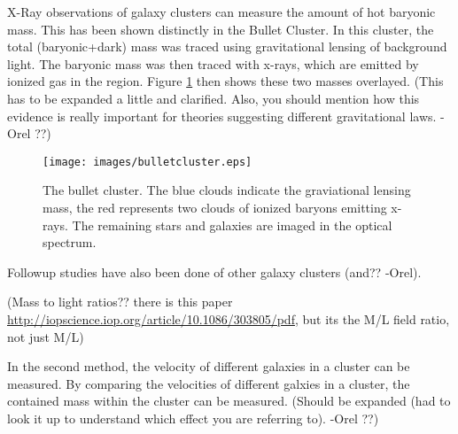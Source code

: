    X-Ray observations of galaxy clusters can measure the amount of hot baryonic mass.
    This has been shown distinctly in the Bullet Cluster\cite{bullet_cluster}.
    In this cluster, the total (baryonic+dark) mass was traced using gravitational lensing of background light.
    The baryonic mass was then traced with x-rays, which are emitted by ionized gas in the region.
    Figure \ref{fig:bullet} then shows these two masses overlayed.
    {\color{red}(This has to be expanded a little and clarified. Also, you should mention how this evidence is really important for theories suggesting different gravitational laws. -Orel ??)}

    \begin{figure}[ht]
      \texttt{[image: images/bulletcluster.eps]}
      \caption[The Bullet Cluster]{
        The bullet cluster\cite{bullet_cluster_combined_image}.
        The blue clouds indicate the graviational lensing mass\cite{bullet_cluster}, the red represents two clouds of ionized baryons emitting x-rays\cite{bullet_cluster_chandramap}.
        The remaining stars and galaxies are imaged in the optical spectrum\cite{bullet_cluster_composite}.}
      \label{fig:bullet}
    \end{figure}

    Followup studies have also been done of other galaxy clusters {\color{red}(and?? -Orel)}.

    {\color{red}(Mass to light ratios?? there is this paper \url{http://iopscience.iop.org/article/10.1086/303805/pdf}, but its the M/L field ratio, not just M/L)}

    In the second method, the velocity of different galaxies in a cluster can be measured.
    By comparing the velocities of different galxies in a cluster, the contained mass within the cluster can be measured.
    {\color{red}(Should be expanded (had to look it up to understand which effect you are referring to). -Orel ??)}

